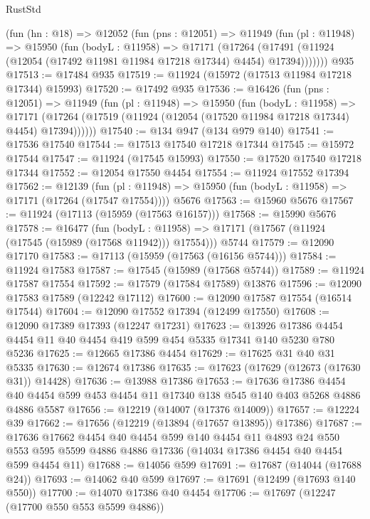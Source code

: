 \begin{lexlean}{RustStd}
\begin{coremodule}
{\begin{coremodule}
{{{{{{{{{{{{{{{{{{{{{{{{{{{{{{{{{{{{{{{{{{{{{{{{{{{{{{{{{{{{{{{{{{{{{{{{{{{{{{{{    (fun (hn : @18) =>
    @12052
      (fun (pns : @12051) =>
      @11949
        (fun (pl : @11948) =>
        @15950
          (fun (bodyL : @11958) =>
          @17171
            (@17264
              (@17491 (@11924 (@12054 (@17492 @11981 @11984 @17218 @17344) @4454) @17394)))))))
    @935
@17513 := @17484 @935
@17519 := @11924 (@15972 (@17513 @11984 @17218 @17344) @15993)
@17520 := @17492 @935
@17536 := @16426
    (fun (pns : @12051) =>
    @11949
      (fun (pl : @11948) =>
      @15950
        (fun (bodyL : @11958) =>
        @17171 (@17264 (@17519 (@11924 (@12054 (@17520 @11984 @17218 @17344) @4454) @17394))))))
@17540 := @134 @947 (@134 @979 @140)
@17541 := @17536 @17540
@17544 := @17513 @17540 @17218 @17344
@17545 := @15972 @17544
@17547 := @11924 (@17545 @15993)
@17550 := @17520 @17540 @17218 @17344
@17552 := @12054 @17550 @4454
@17554 := @11924 @17552 @17394
@17562 := @12139
    (fun (pl : @11948) => @15950 (fun (bodyL : @11958) => @17171 (@17264 (@17547 @17554))))
    @5676
@17563 := @15960 @5676
@17567 := @11924 (@17113 (@15959 (@17563 @16157)))
@17568 := @15990 @5676
@17578 := @16477
    (fun (bodyL : @11958) => @17171 (@17567 (@11924 (@17545 (@15989 (@17568 @11942))) @17554)))
    @5744
@17579 := @12090 @17170
@17583 := @17113 (@15959 (@17563 (@16156 @5744)))
@17584 := @11924 @17583
@17587 := @17545 (@15989 (@17568 @5744))
@17589 := @11924 @17587 @17554
@17592 := @17579 (@17584 @17589) @13876
@17596 := @12090 @17583 @17589 (@12242 @17112)
@17600 := @12090 @17587 @17554 (@16514 @17544)
@17604 := @12090 @17552 @17394 (@12499 @17550)
@17608 := @12090 @17389 @17393 (@12247 @17231)
@17623 := @13926 @17386 @4454 @4454 @11 @40 @4454 @419 @599 @454 @5335 @17341 @140 @5230 @780 @5236
@17625 := @12665 @17386 @4454
@17629 := @17625 @31 @40 @31 @5335
@17630 := @12674 @17386
@17635 := @17623 (@17629 (@12673 (@17630 @31)) @14428)
@17636 := @13988 @17386
@17653 := @17636
    @17386
    @4454
    @40
    @4454
    @599
    @453
    @4454
    @11
    @17340
    @138
    @545
    @140
    @403
    @5268
    @4886
    @4886
    @5587
@17656 := @12219 (@14007 (@17376 @14009))
@17657 := @12224 @39
@17662 := @17656 (@12219 (@13894 (@17657 @13895)) @17386)
@17687 := @17636
    @17662
    @4454
    @40
    @4454
    @599
    @140
    @4454
    @11
    @4893
    @24
    @550
    @553
    @595
    @5599
    @4886
    @4886
    @17336
    (@14034 @17386 @4454 @40 @4454 @599 @4454 @11)
@17688 := @14056 @599
@17691 := @17687 (@14044 (@17688 @24))
@17693 := @14062 @40 @599
@17697 := @17691 (@12499 (@17693 @140 @550))
@17700 := @14070 @17386 @40 @4454
@17706 := @17697 (@12247 (@17700 @550 @553 @5599 @4886))
}}}}}}}}}}}}}}}}}}}}}}}}}}}}}}}}}}}}}}}}}}}}}}}}}}}}}}}}}}}}}}}}}}}}}}}}}}}}}}}}
\end{coremodule}}
\end{coremodule}
\end{lexlean}
